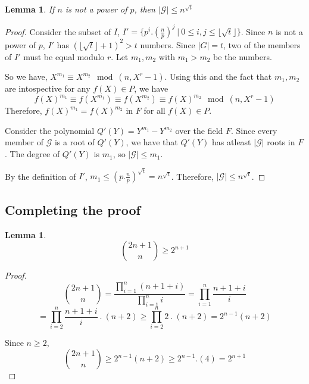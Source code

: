 \documentclass[11pt]{report}
\newtheorem{lemma}[theorem]{Lemma}
\begin{document}
\begin{lemma}
\label{lemma:GUpperBound}
If $n$ is not a power of $p$, then $|\mathcal{G}| \leq n^{\sqrt{t}}$
\end{lemma}
\begin{proof}
Consider the subset of $I$, $I' = \{p^i.(\frac{n}{p})^j\ |\ 0 \leq i, j \leq \lfloor \sqrt{t} \rfloor \}$.
Since $n$ is not a power of $p$, $I'$ has $(\lfloor \sqrt{t} \rfloor + 1)^2 > t$ numbers. Since $|G| = t$, two of the members of $I'$ must be equal modulo $r$. Let $m_1, m_2$ with $m_1 > m_2$ be the numbers. 

So we have, $X^{m_1} \equiv X^{m_2} \mod (n, X^r-1)$. Using this and the fact that $m_1, m_2$ are intospective for any $f(X) \in P$, we have 
\[f(X)^{m_1} \equiv f(X^{m_1}) \equiv f(X^{m_2}) \equiv f(X)^{m_2} \mod (n, X^r-1)\]
Therefore, $f(X)^{m_1} = f(X)^{m_2}$ in $F$ for all $f(X) \in P$. 

Consider the polynomial $Q'(Y) = Y^{m_1} - Y^{m_2}$ over the field $F$. Since every member of $\mathcal{G}$ is a root of $Q'(Y)$, we have that $Q'(Y)$ has atleast $|\mathcal{G}|$ roots in $F$. The degree of $Q'(Y)$ is $m_1$, so $|\mathcal{G}| \leq m_1$.

By the definition of $I'$, $m_1 \leq (p.\frac{n}{p})^{\sqrt{t}} = n^{\sqrt{t}}$. Therefore, $|\mathcal{G}| \leq n^{\sqrt{t}}$.

\end{proof}

\subsection{Completing the proof}
\begin{lemma}
\label{lemma:CombinationsLemma}
\[{2n+1 \choose n} \geq 2^{n+1}\]
\end{lemma}
\begin{proof}
\[{2n+1 \choose n} = \frac{\prod_{i=1}^{n}(n+1+i)}{\prod_{i=1}^{n}{i}} = \prod_{i=1}^{n}\frac{n+1+i}{i}\]
\[ = \prod_{i=2}^{n}\frac{n+1+i}{i}\ .\ (n+2) \geq \prod_{i=2}^{n}2\ .\ (n+2) = 2^{n-1}(n+2)\]

Since $n \geq 2$,
\[{2n+1 \choose n} \geq 2^{n-1}(n+2) \geq 2^{n-1}.(4) = 2^{n+1}\]
\[\]
\end{proof}
\end{document}
